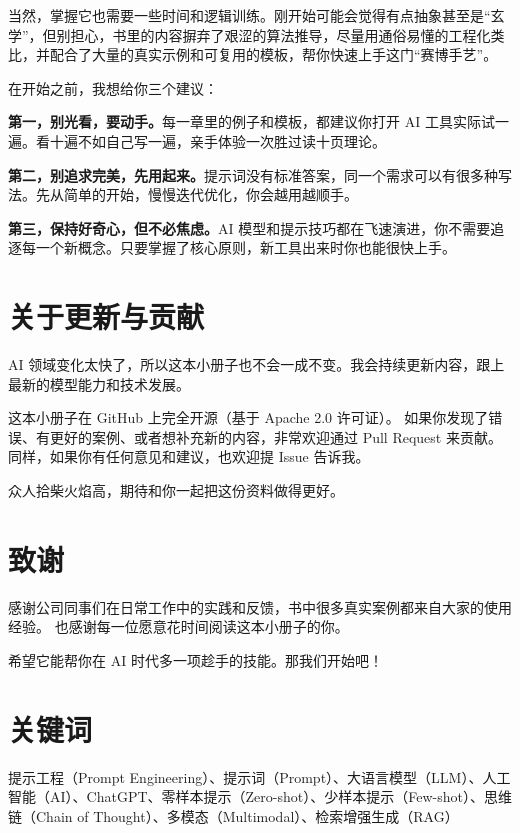 当然，掌握它也需要一些时间和逻辑训练。刚开始可能会觉得有点抽象甚至是“玄学”，但别担心，书里的内容摒弃了艰涩的算法推导，尽量用通俗易懂的工程化类比，并配合了大量的真实示例和可复用的模板，帮你快速上手这门“赛博手艺”。

在开始之前，我想给你三个建议：

\textbf{第一，别光看，要动手。}每一章里的例子和模板，都建议你打开 AI 工具实际试一遍。看十遍不如自己写一遍，亲手体验一次胜过读十页理论。

\textbf{第二，别追求完美，先用起来。}提示词没有标准答案，同一个需求可以有很多种写法。先从简单的开始，慢慢迭代优化，你会越用越顺手。

\textbf{第三，保持好奇心，但不必焦虑。}AI 模型和提示技巧都在飞速演进，你不需要追逐每一个新概念。只要掌握了核心原则，新工具出来时你也能很快上手。

\section*{关于更新与贡献}

AI 领域变化太快了，所以这本小册子也不会一成不变。我会持续更新内容，跟上最新的模型能力和技术发展。

这本小册子在 GitHub 上完全开源（基于 Apache 2.0 许可证）。
如果你发现了错误、有更好的案例、或者想补充新的内容，非常欢迎通过 Pull Request 来贡献。
同样，如果你有任何意见和建议，也欢迎提 Issue 告诉我。

众人拾柴火焰高，期待和你一起把这份资料做得更好。

\section*{致谢}

感谢公司同事们在日常工作中的实践和反馈，书中很多真实案例都来自大家的使用经验。
也感谢每一位愿意花时间阅读这本小册子的你。

希望它能帮你在 AI 时代多一项趁手的技能。那我们开始吧！

\section*{关键词}

提示工程（Prompt Engineering）、提示词（Prompt）、大语言模型（LLM）、人工智能（AI）、ChatGPT、零样本提示（Zero-shot）、少样本提示（Few-shot）、思维链（Chain of Thought）、多模态（Multimodal）、检索增强生成（RAG）
